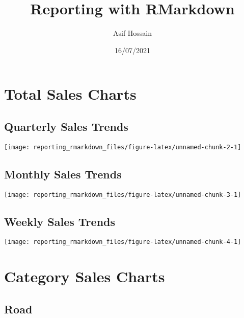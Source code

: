 \documentclass[
]{article}
\title{Reporting with RMarkdown}
\author{Asif Hossain}
\date{16/07/2021}
\begin{document}
\maketitle

{
\setcounter{tocdepth}{2}
\tableofcontents
}
\hypertarget{total-sales-charts}{%
\section{Total Sales Charts}\label{total-sales-charts}}

\hypertarget{quarterly-sales-trends}{%
\subsection{Quarterly Sales Trends}\label{quarterly-sales-trends}}

\begin{center}\texttt{[image: reporting\_rmarkdown\_files/figure-latex/unnamed-chunk-2-1]} \end{center}

\hypertarget{monthly-sales-trends}{%
\subsection{Monthly Sales Trends}\label{monthly-sales-trends}}

\begin{center}\texttt{[image: reporting\_rmarkdown\_files/figure-latex/unnamed-chunk-3-1]} \end{center}

\hypertarget{weekly-sales-trends}{%
\subsection{Weekly Sales Trends}\label{weekly-sales-trends}}

\begin{center}\texttt{[image: reporting\_rmarkdown\_files/figure-latex/unnamed-chunk-4-1]} \end{center}

\hypertarget{category-sales-charts}{%
\section{Category Sales Charts}\label{category-sales-charts}}

\hypertarget{road}{%
\subsection{Road}\label{road}}
\end{document}
